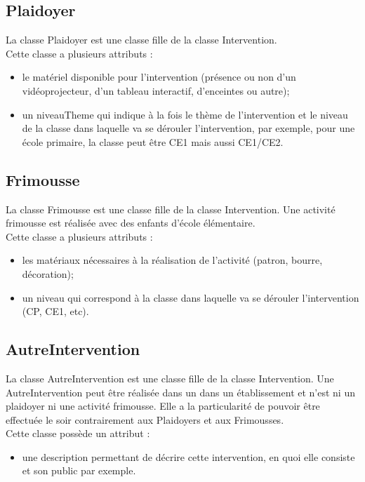 \documentclass[asi, sansVersion]{picInsa}
\begin{document}
\subsection*{Plaidoyer}
La classe Plaidoyer est une classe fille de la classe Intervention. \\
Cette classe a plusieurs attributs : 
\begin{itemize}
\item le matériel disponible pour l'intervention (présence ou non d'un vidéoprojecteur, d'un tableau interactif, d'enceintes ou autre);
\item un niveauTheme qui indique à la fois le thème de l'intervention et le niveau de la classe dans laquelle va se dérouler l'intervention, par exemple, pour une école primaire, la classe peut être CE1 mais aussi CE1/CE2.
\end{itemize}

\subsection*{Frimousse}
La classe Frimousse est une classe fille de la classe Intervention. Une activité frimousse est réalisée avec des enfants d'école élémentaire. \\
Cette classe a plusieurs attributs :
\begin{itemize}
\item les matériaux nécessaires à la réalisation de l'activité (patron, bourre, décoration);
\item un niveau qui correspond à la classe dans laquelle va se dérouler l'intervention (CP, CE1, etc).
\end{itemize}

\subsection*{AutreIntervention}
La classe AutreIntervention est une classe fille de la classe Intervention. Une AutreIntervention peut être réalisée dans un dans un établissement et n'est ni un plaidoyer ni une activité frimousse. Elle a la particularité de pouvoir être effectuée le soir contrairement aux Plaidoyers et aux Frimousses. \\
Cette classe possède un attribut :
\begin{itemize}
\item une description permettant de décrire cette intervention, en quoi elle consiste et son public par exemple.
\end{itemize}
\end{document}
